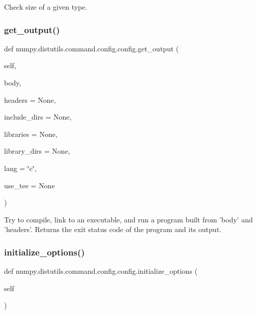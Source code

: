 \begin{DoxyVerb}Check size of a given type.\end{DoxyVerb}
 \mbox{\label{classnumpy_1_1distutils_1_1command_1_1config_1_1config_a00e019e0e3dd16d936699a4d46066203}} 
\subsubsection{\texorpdfstring{get\+\_\+output()}{get\_output()}}
{\footnotesize\ttfamily def numpy.\+distutils.\+command.\+config.\+config.\+get\+\_\+output (\begin{DoxyParamCaption}\item[{}]{self,  }\item[{}]{body,  }\item[{}]{headers = {\ttfamily None},  }\item[{}]{include\+\_\+dirs = {\ttfamily None},  }\item[{}]{libraries = {\ttfamily None},  }\item[{}]{library\+\_\+dirs = {\ttfamily None},  }\item[{}]{lang = {\ttfamily \char`\"{}c\char`\"{}},  }\item[{}]{use\+\_\+tee = {\ttfamily None} }\end{DoxyParamCaption})}

\begin{DoxyVerb}Try to compile, link to an executable, and run a program
built from 'body' and 'headers'. Returns the exit status code
of the program and its output.
\end{DoxyVerb}
 \mbox{\label{classnumpy_1_1distutils_1_1command_1_1config_1_1config_a56e45705ea4eb4e87e00841d5361a52c}} 
\subsubsection{\texorpdfstring{initialize\+\_\+options()}{initialize\_options()}}
{\footnotesize\ttfamily def numpy.\+distutils.\+command.\+config.\+config.\+initialize\+\_\+options (\begin{DoxyParamCaption}\item[{}]{self }\end{DoxyParamCaption})}



